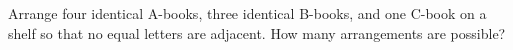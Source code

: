 Arrange four identical A-books, three identical B-books, and one C-book on a shelf so that no equal letters are adjacent. How many arrangements are possible?

